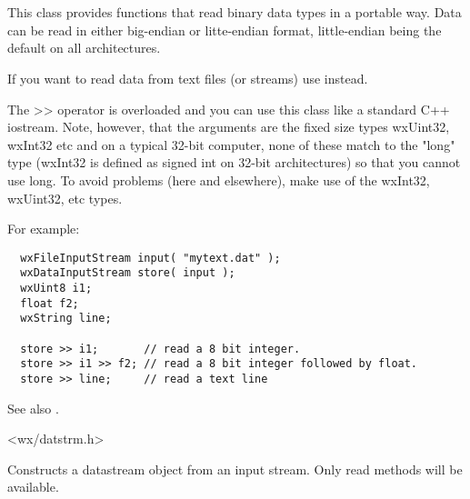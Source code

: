 \section{}\label{wxdatainputstream}

This class provides functions that read binary data types in a
portable way. Data can be read in either big-endian or litte-endian
format, little-endian being the default on all architectures.

If you want to read data from text files (or streams) use 
 instead.

The >> operator is overloaded and you can use this class like a standard C++ iostream.
Note, however, that the arguments are the fixed size types wxUint32, wxInt32 etc
and on a typical 32-bit computer, none of these match to the "long" type (wxInt32
is defined as signed int on 32-bit architectures) so that you cannot use long. To avoid
problems (here and elsewhere), make use of the wxInt32, wxUint32, etc types.

For example:
\begin{verbatim}
  wxFileInputStream input( "mytext.dat" );
  wxDataInputStream store( input );
  wxUint8 i1;
  float f2;
  wxString line;

  store >> i1;       // read a 8 bit integer.
  store >> i1 >> f2; // read a 8 bit integer followed by float.
  store >> line;     // read a text line
\end{verbatim}

See also . 


<wx/datstrm.h>


\label{wxdatainputstreamconstr}


Constructs a datastream object from an input stream. Only read methods will
be available.




